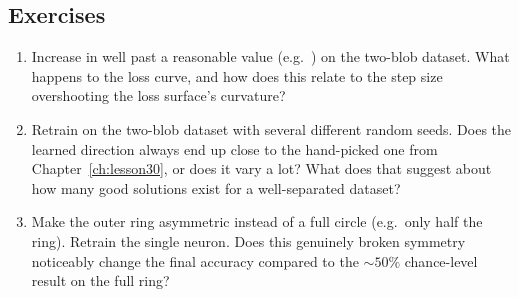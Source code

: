 \subsection*{Exercises}
\begin{enumerate}
  \item Increase  in  well past a reasonable value (e.g.\ ) on the two-blob dataset. What happens to the loss curve, and how does this relate to the step size overshooting the loss surface's curvature?
  \item Retrain on the two-blob dataset with several different random seeds. Does the learned direction always end up close to the hand-picked one from Chapter~\ref{ch:lesson30}, or does it vary a lot? What does that suggest about how many good solutions exist for a well-separated dataset?
  \item Make the outer ring asymmetric instead of a full circle (e.g.\ only half the ring). Retrain the single neuron. Does this genuinely broken symmetry noticeably change the final accuracy compared to the $\sim50\%$ chance-level result on the full ring?
\end{enumerate}

\vfill
{}
